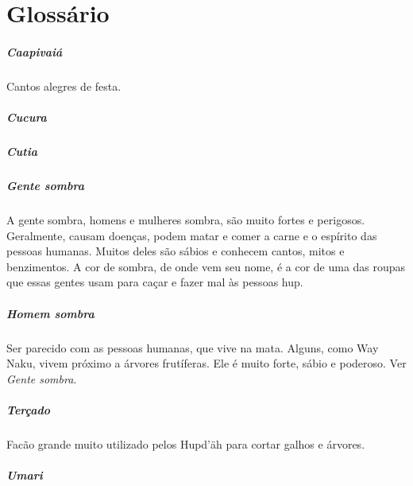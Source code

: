 \chapter{Glossário}

\paragraph{Caapivaiá} Cantos alegres de festa.

\paragraph{Cucura} 

\paragraph{Cutia} 

\paragraph{Gente sombra} A gente sombra, homens e mulheres sombra, são
muito fortes e perigosos. Geralmente, causam doenças, podem matar
e comer a carne e o espírito das pessoas humanas. Muitos deles
são sábios e conhecem cantos, mitos e benzimentos. A cor de
sombra, de onde vem seu nome, é a cor de uma das roupas que essas gentes
usam para caçar e fazer mal às pessoas hup.

\paragraph{Homem sombra} Ser parecido com as pessoas
humanas, que vive na mata. Alguns, como Way Naku, vivem próximo a árvores frutíferas. Ele
é muito forte, sábio e poderoso. Ver \textit{Gente sombra}.

\paragraph{Terçado} Facão grande muito utilizado pelos Hupd’äh para cortar
galhos e árvores.

\paragraph{Umari} 


